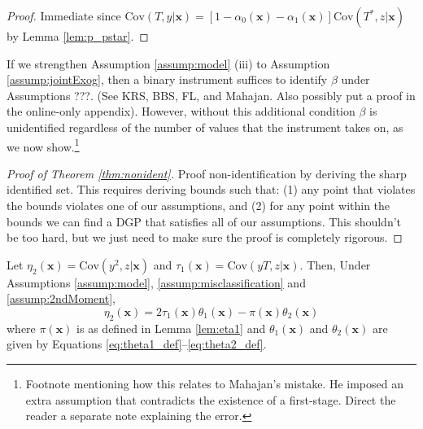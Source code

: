 \documentclass[12pt]{article}
\begin{document}
\begin{proof}
  Immediate since $\mbox{Cov}(T,y|\mathbf{x}) = \left[ 1 - \alpha_0(\mathbf{x}) - \alpha_1(\mathbf{x}) \right] \mbox{Cov}(T^*,z|\mathbf{x})$ by Lemma \ref{lem:p_pstar}.
\end{proof}

\noindent If we strengthen Assumption \ref{assump:model} (iii) to Assumption \ref{assump:jointExog}, then a binary instrument suffices to identify $\beta$ under Assumptions ???.
(See KRS, BBS, FL, and Mahajan. Also possibly put a proof in the online-only appendix).
However, without this additional condition $\beta$ is unidentified regardless of the number of values that the instrument takes on, as we now show.\footnote{Footnote mentioning how this relates to Mahajan's mistake. He imposed an extra assumption that contradicts the existence of a first-stage. Direct the reader a separate note explaining the error.}
\begin{thm}
  \label{thm:nonident}
\end{thm}

\begin{proof}[Proof of Theorem \ref{thm:nonident}]
  Proof non-identification by deriving the sharp identified set.
  This requires deriving bounds such that: (1) any point that violates the bounds violates one of our assumptions, and (2) for any point within the bounds we can find a DGP that satisfies all of our assumptions.
  This shouldn't be too hard, but we just need to make sure the proof is completely rigorous.
\end{proof}

\begin{lem}
  Let $\eta_2(\mathbf{x}) = \mbox{Cov}(y^2,z|\mathbf{x})$ and $\tau_1(\mathbf{x}) = \mbox{Cov}(yT,z|\mathbf{x})$.
Then, Under Assumptions \ref{assump:model}, \ref{assump:misclassification} and \ref{assump:2ndMoment}, 
\[
    \eta_2(\mathbf{x}) =  2\tau_1(\mathbf{x}) \theta_1(\mathbf{x}) - \pi(\mathbf{x})\theta_2(\mathbf{x})
\]
where $\pi(\mathbf{x})$ is as defined in Lemma \ref{lem:eta1} and $\theta_1(\mathbf{x})$ and $\theta_2(\mathbf{x})$ are given by Equations \ref{eq:theta1_def}--\ref{eq:theta2_def}.
  \label{lem:eta2}
\end{lem}
\end{document}
